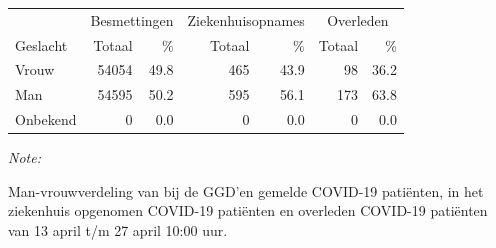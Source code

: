 \documentclass[
  english,
  man,floatsintext]{apa6}
\begin{document}
\begin{table}
\centering\begingroup\fontsize{11}{13}\selectfont

\begin{threeparttable}
\begin{tabular}{lrrrrrr}
\toprule
\multicolumn{1}{c}{ } & \multicolumn{2}{c}{Besmettingen} & \multicolumn{2}{c}{Ziekenhuisopnames} & \multicolumn{2}{c}{Overleden} \\
\cmidrule(l{3pt}r{3pt}){2-3} \cmidrule(l{3pt}r{3pt}){4-5} \cmidrule(l{3pt}r{3pt}){6-7}
Geslacht & Totaal & \% & Totaal & \% & Totaal & \%\\
\midrule
Vrouw & 54054 & 49.8 & 465 & 43.9 & 98 & 36.2\\
Man & 54595 & 50.2 & 595 & 56.1 & 173 & 63.8\\
Onbekend & 0 & 0.0 & 0 & 0.0 & 0 & 0.0\\
\bottomrule
\end{tabular}
\begin{tablenotes}
\item \textit{Note: } 
\item Man-vrouwverdeling van bij de GGD’en gemelde COVID-19 patiënten, in het ziekenhuis opgenomen COVID-19 patiënten en overleden COVID-19 patiënten van 13 april t/m 27 april 10:00 uur.
\end{tablenotes}
\end{threeparttable}
\endgroup{}
\end{table}
\newpage
\end{document}
